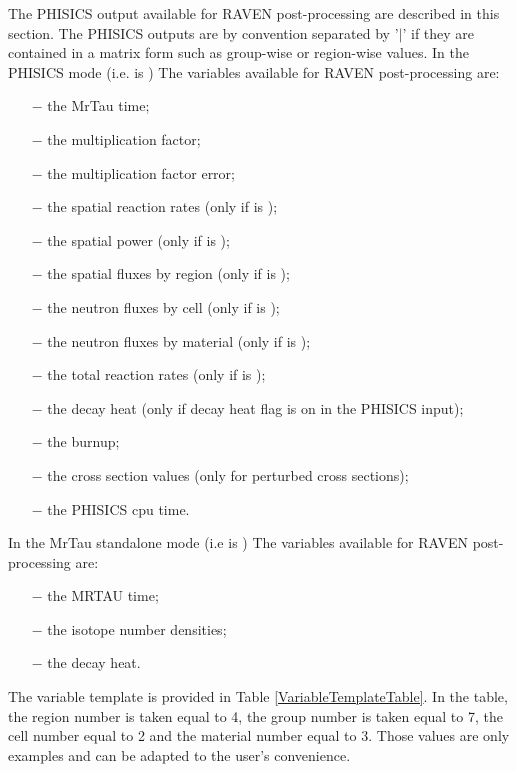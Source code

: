 The PHISICS output available for RAVEN post-processing are described in this section. The PHISICS outputs
 are by convention separated by '$\vert$' if they are contained in a matrix form such as group-wise or region-wise values.
In the PHISICS mode (i.e.  is ) The variables available for RAVEN
 post-processing are:
\begin{enumerate}
  \item [$-$]the MrTau time;
  \item [$-$]the multiplication factor;
  \item [$-$]the multiplication factor error;
  \item [$-$]the spatial reaction rates (only if  is );
  \item [$-$]the spatial power (only if  is );
  \item [$-$]the spatial fluxes by region (only if  is );
  \item [$-$]the neutron fluxes by cell (only if  is );
  \item [$-$]the neutron fluxes by material (only if  is );
  \item [$-$]the total reaction rates (only if  is );
  \item [$-$]the decay heat (only if decay heat flag is on in the PHISICS input);
  \item [$-$]the burnup;
  \item [$-$]the cross section values (only for perturbed cross sections);
  \item [$-$]the PHISICS cpu time.
\end{enumerate}

In the MrTau standalone mode (i.e  is ) The variables available for RAVEN post-processing are:
\begin{enumerate}
  \item [$-$]the MRTAU time;
  \item [$-$]the isotope number densities;
  \item [$-$]the decay heat.
\end{enumerate}

The variable template is provided in Table \ref{VariableTemplateTable}. In the table, the region number is taken equal to 4,
 the group number is taken equal to 7, the cell number equal to 2 and the material number equal to 3.
Those values are only examples and can be adapted to the user's convenience.

